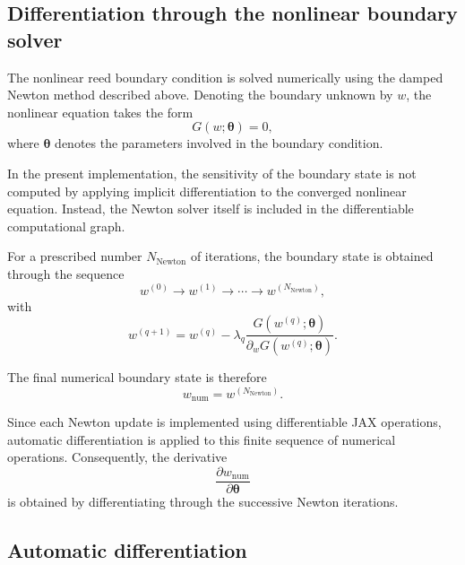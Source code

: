 \documentclass[11pt,a4paper]{report}
\theoremstyle{plain}
\theoremstyle{definition}
\begin{document}
\subsection{Differentiation through the nonlinear boundary solver}

The nonlinear reed boundary condition is solved numerically using the damped
Newton method described above. Denoting the boundary unknown by \(w\), the
nonlinear equation takes the form
\begin{equation}
G(w;\boldsymbol{\theta})=0,
\end{equation}
where \(\boldsymbol{\theta}\) denotes the parameters involved in the boundary
condition.

In the present implementation, the sensitivity of the boundary state is not
computed by applying implicit differentiation to the converged nonlinear
equation. Instead, the Newton solver itself is included in the differentiable
computational graph.

For a prescribed number \(N_{\mathrm{Newton}}\) of iterations, the boundary
state is obtained through the sequence
\begin{equation}
w^{(0)}
\longrightarrow
w^{(1)}
\longrightarrow
\cdots
\longrightarrow
w^{(N_{\mathrm{Newton}})},
\end{equation}
with
\begin{equation}
w^{(q+1)}
=
w^{(q)}
-
\lambda_q
\frac{
G(w^{(q)};\boldsymbol{\theta})
}{
\partial_w G(w^{(q)};\boldsymbol{\theta})
}.
\end{equation}

The final numerical boundary state is therefore
\begin{equation}
w_{\mathrm{num}}
=
w^{(N_{\mathrm{Newton}})}.
\end{equation}

Since each Newton update is implemented using differentiable JAX operations,
automatic differentiation is applied to this finite sequence of numerical
operations. Consequently, the derivative
\begin{equation}
\frac{\partial w_{\mathrm{num}}}
     {\partial \boldsymbol{\theta}}
\end{equation}
is obtained by differentiating through the successive Newton iterations.



\subsection{Automatic differentiation}
\end{document}
